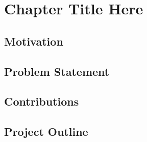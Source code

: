 
\chapter{Chapter Title Here} %
\label{Chapter1}

\section{Motivation}
\section{Problem Statement}
\section{Contributions}
\section{Project Outline}

